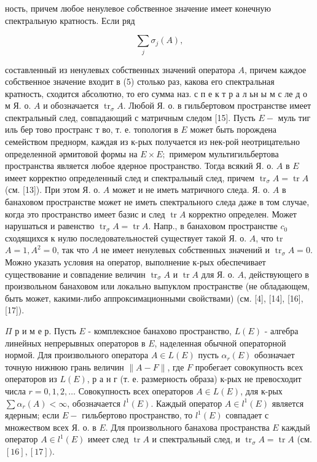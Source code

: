 \documentclass[10pt]{article}
\begin{document}
ность, причем любое ненулевое собственное значение имеет конечную спектральную кратность. Если ряд



\[

\sum_{j} \sigma_{j}(A),

\]



составленный из ненулевых собственных значений оператора $A$, причем каждое собственное значение входит в (5) столько раз, какова его спектральная кратность, сходится абсолютно, то его сумма наз. с п е к т р а л ьн ы м с ле д о м Я. о. $A$ и обозначается $\operatorname{tr}_{\sigma} A$. Любой Я. $о$. в гильбертовом пространстве имеет спектральный след, совпадающий с матричным следом [15]. Пусть $E-$ муль тиг иль бер тово пространс т во, т. е. топология в $E$ может быть порождена семейством преднорм, каждая из к-рых получается из нек-рой неотрицательно определенной әрмитовой формы на $E \times E ;$ примером мультигильбертова пространства является любое ядерное пространство. Тогда всякий Я. о. $A$ в $E$ имеет корректно определенный след и спектральный след, причем $\operatorname{tr}_{\sigma} A=\operatorname{tr} A$ (см. [13]). При этом Я. о. $A$ может и не иметь матричного следа. Я. о. $A$ в банаховом пространстве может не иметь спектрального следа даже в том случае, когда это пространство имеет базис и след $\operatorname{tr} A$ корректно определен. Может нарушаться и равенство $\operatorname{tr}_{\sigma} A=\operatorname{tr} A$. Напр., в банаховом пространстве $c_{0}$ сходящихся к нулю последовательностей существует такой Я. о. $A$, что tr $A=1, A^{2}=0$, так что $A$ не имеет ненулевых собственных значений и $\operatorname{tr}_{\sigma} A=0$. Можно указать условия на оператор, выполнение к-рых обеспечивает существование и совпадение величин $\operatorname{tr}_{\sigma} A$ и $\operatorname{tr} A$ для Я. о. $A$, действующего в произвольном банаховом или локально выпуклом пространстве (не обладающем, быть может, какими-либо аппроксимационными свойствами) (см. [4], [14], [16], [17]).



$\Pi$ р и м е р. Пусть $E$ - комплексное банахово пространство, $L(E)$ - алгебра линейных непрерывных операторов в $E$, наделенная обычной операторной нормой. Для произвольного оператора $A \in L(E)$ пусть $\alpha_{r}(E)$ обозначает точную нижнюю грань величин $\|A-F\|$, где $F$ пробегает совокупность всех операторов из $L(E)$, р а н г (т. е. размерность образа) к-рых не превосходит числа $r=0,1,2, \ldots$ Совокупность всех операторов $A \in L(E)$, для к-рых $\sum \alpha_{r}(A)<\infty$, обозначается $l^{1}(E)$. Каждый оператор $A \in l^{1}(E)$ является ядерным; если $E-$ гильбертово пространство, то $l^{1}(E)$ совпадает с множеством всех Я. о. в $E$. Для произвольного банахова пространства $E$ каждый оператор $A \in l^{1}(E)$ имеет след $\operatorname{tr} A$ и спектральный след, и $\operatorname{tr}_{\sigma} A=\operatorname{tr} A$ (см. $[16],[17])$.
\end{document}
